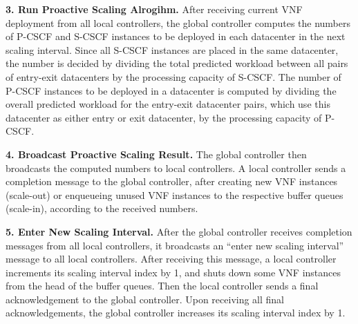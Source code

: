 \noindent\textbf{3. Run Proactive Scaling Alrogihm.} After receiving current VNF deployment from all local controllers, the global controller computes the numbers of P-CSCF and S-CSCF instances to be deployed in each datacenter in the next scaling interval. Since all S-CSCF instances are placed in the same datacenter, the number is decided by dividing the total predicted workload between all pairs of entry-exit datacenters by the processing capacity of S-CSCF. The number of P-CSCF instances to be deployed in a datacenter is computed by dividing the overall predicted workload for the entry-exit datacenter pairs, which use this datacenter as either entry or exit datacenter, by the processing capacity of P-CSCF.

\noindent\textbf{4. Broadcast Proactive Scaling Result.} The global controller then broadcasts the computed numbers to local controllers. A local controller sends a completion message to the global controller, after creating new VNF instances (scale-out) or enqueueing unused VNF instances to the respective buffer queues (scale-in), according to the received numbers.

\noindent\textbf{5. Enter New Scaling Interval.} After the global controller receives completion messages from all local controllers, it broadcasts an ``enter new scaling interval'' message to all local controllers. After receiving this message, a local controller increments its scaling interval index by 1, and shuts down some VNF instances from the head of the buffer queues. Then the local controller sends a final acknowledgement to the global controller. Upon receiving all final acknowledgements, %
 the global controller increases its scaling interval index by 1.

